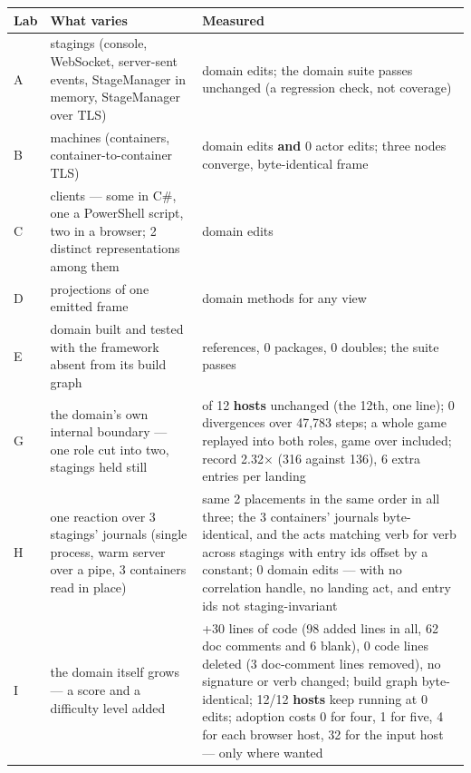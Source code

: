 \documentclass[
]{article}
\newcounter{none} %
\begin{document}
{\def\LTcaptype{none} %
\begin{longtable}[]{@{}
  >{\raggedright\arraybackslash}p{}
  >{\raggedright\arraybackslash}p{}
  >{\raggedright\arraybackslash}p{}@{}}
\toprule\noalign{}
\begin{minipage}[b]{\linewidth}\raggedright
Lab
\end{minipage} & \begin{minipage}[b]{\linewidth}\raggedright
What varies
\end{minipage} & \begin{minipage}[b]{\linewidth}\raggedright
Measured
\end{minipage} \\
\midrule\noalign{}
\endhead
\bottomrule\noalign{}
\endlastfoot
A & 5 stagings (console, WebSocket, server-sent events, StageManager in
memory, StageManager over TLS) & 0 domain edits; the domain suite passes
unchanged (a regression check, not coverage) \\
B & 3 machines (containers, container-to-container TLS) & 0 domain edits
\textbf{and} 0 actor edits; three nodes converge, byte-identical
frame \\
C & 6 clients --- some in C\#, one a PowerShell script, two in a
browser; 2 distinct representations among them & 0 domain edits \\
D & 3 projections of one emitted frame & 0 domain methods for any
view \\
E & domain built and tested with the framework absent from its build
graph & 0 references, 0 packages, 0 doubles; the suite passes \\
G & the domain's own internal boundary --- one role cut into two,
stagings held still & 11 of 12 \textbf{hosts} unchanged (the 12th, one
line); 0 divergences over 47,783 steps; a whole game replayed into both
roles, game over included; record 2.32× (316 against 136), 6 extra
entries per landing \\
H & one reaction over 3 stagings' journals (single process, warm server
over a pipe, 3 containers read in place) & same 2 placements in the same
order in all three; the 3 containers' journals byte-identical, and the
acts matching verb for verb across stagings with entry ids offset by a
constant; 0 domain edits --- with no correlation handle, no landing act,
and entry ids not staging-invariant \\
I & the domain itself grows --- a score and a difficulty level added &
+30 lines of code (98 added lines in all, 62 doc comments and 6 blank),
0 code lines deleted (3 doc-comment lines removed), no signature or verb
changed; build graph byte-identical; 12/12 \textbf{hosts} keep running
at 0 edits; adoption costs 0 for four, 1 for five, 4 for each browser
host, 32 for the input host --- only where wanted \\
\end{longtable}
}
\end{document}
